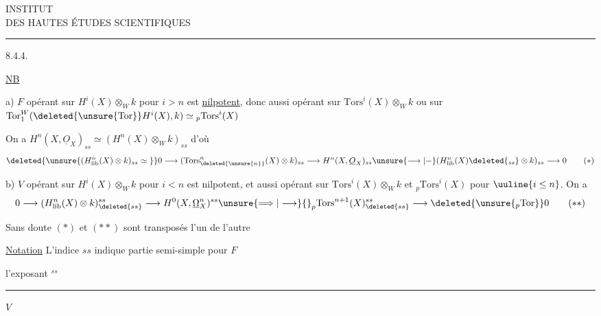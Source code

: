 \begin{center}
INSTITUT\\
DES HAUTES ÉTUDES SCIENTIFIQUES\\
\rule{1.1cm}{.35pt}
\end{center}

8.4.4.

\uline{NB}

a) $F$ opérant sur $H^i(X)\otimes_W k$ pour $i>n$ est \uline{nilpotent}, donc aussi opérant sur $\mathrm{Tors}^i(X)\otimes_W k$ ou sur $\mathrm{Tor}^{W}_{1}(\deleted{\unsure{\mathrm{Tor}}}H^i(X),k)\simeq {}_p\mathrm{Tors}^i(X)$

On a $H^n(X,\underline{O}_X)_{ss}\simeq(H^n(X)\otimes_W k)_{ss}$ d'où
\[
\deleted{\unsure{(H^{n}_{\rm lib}(X)\otimes k)_{ss}\simeq{}}}
0\longrightarrow(\mathrm{Tors}^{n}_{\deleted{\unsure{n}}}(X)\otimes k)_{ss}
\longrightarrow H^n(X,\underline{O}_X)_{ss}
\unsure{\longrightarrow|-}(H^n_{\rm lib}(X)\deleted{{}_{ss}}\otimes k)_{ss}\longrightarrow0
\tag*{$(*)$}
\]

b) $V$ opérant sur $H^i(X)\otimes_W k$ pour $i<n$ est nilpotent, et aussi opérant sur $\mathrm{Tors}^i(X)\otimes_W k$ et $ {}_p\mathrm{Tors}^i(X)$ pour $\uuline{i\leq n}$. On a
\[
0\longrightarrow(H^n_{\rm lib}(X)\otimes k)_{\deleted{ss}}^{ss}
\longrightarrow H^0(X,\underline{\Omega}^{n}_X)^{ss}
\unsure{\Longrightarrow|\longrightarrow} {}_p\mathrm{Tors}^{n+1}(X)_{\deleted{ss}}^{ss}
\longrightarrow\deleted{\unsure{{}_p\mathrm{Tor}}}0
\tag*{$(**)$}
\]

Sans doute $(*)$ et $(**)$ sont transposés l'un de l'autre

\uline{Notation} L'indice $ss$ indique partie semi-simple pour $F$

l'exposant $^{ss}$ \rule[.5ex]{.38\linewidth}{.3pt} $V$

